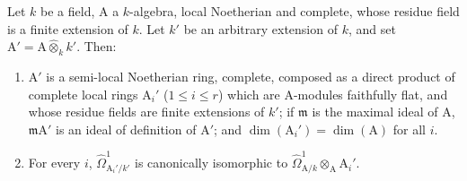\begin{lemma}[18.11.4]
\label{IV.18.11.4}
Let $k$ be a field, $\mathrm{A}$ a $k$-algebra, local Noetherian and complete, whose residue field is a finite extension of $k$.
Let $k'$ be an arbitrary extension of $k$, and set $\mathrm{A}'=\mathrm{A}\widehat{\otimes}_kk'$.
Then:
\begin{enumerate}[label=(\roman*)]
  \item $\mathrm{A}'$ is a semi-local Noetherian ring, complete, composed as a direct product of complete local rings $\mathrm{A}_i'$ ($1\leq i\leq r$) which are $\mathrm{A}$-modules faithfully flat, and whose residue fields are finite extensions of $k'$; if $\mathfrak{m}$ is the maximal ideal of $\mathrm{A}$, $\mathfrak{m}\mathrm{A}'$ is an ideal of definition of $\mathrm{A}'$; and $\dim(\mathrm{A}_i')=\dim(\mathrm{A})$ for all $i$.
  \item For every $i$, $\hat{\Omega}^1_{\mathrm{A}_i'/k'}$ is canonically isomorphic to $\hat{\Omega}^1_{\mathrm{A}/k}\otimes_{\mathrm{A}}\mathrm{A}_i'$.
\end{enumerate}
\end{lemma}

